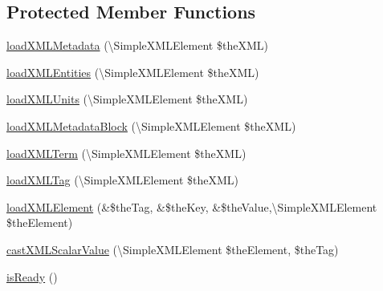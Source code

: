 \subsection*{Protected Member Functions}
\begin{DoxyCompactItemize}
\item 
\hyperlink{class_ontology_wrapper_1_1_wrapper_aa8b5ac231784ffcda74ea463c6e92cc1}{load\-X\-M\-L\-Metadata} (\textbackslash{}Simple\-X\-M\-L\-Element \$the\-X\-M\-L)
\item 
\hyperlink{class_ontology_wrapper_1_1_wrapper_adbb3bf1090ccdf7ed89ffd494a0b101c}{load\-X\-M\-L\-Entities} (\textbackslash{}Simple\-X\-M\-L\-Element \$the\-X\-M\-L)
\item 
\hyperlink{class_ontology_wrapper_1_1_wrapper_aaad33b2f3f398545a234f7650f126321}{load\-X\-M\-L\-Units} (\textbackslash{}Simple\-X\-M\-L\-Element \$the\-X\-M\-L)
\item 
\hyperlink{class_ontology_wrapper_1_1_wrapper_a3500af2ce8421aed6b1f6dcfb5112546}{load\-X\-M\-L\-Metadata\-Block} (\textbackslash{}Simple\-X\-M\-L\-Element \$the\-X\-M\-L)
\item 
\hyperlink{class_ontology_wrapper_1_1_wrapper_a14c77bdeec16286c776ebe375efdd284}{load\-X\-M\-L\-Term} (\textbackslash{}Simple\-X\-M\-L\-Element \$the\-X\-M\-L)
\item 
\hyperlink{class_ontology_wrapper_1_1_wrapper_ae15fd84eb510838a278ccd24c7bcc4a5}{load\-X\-M\-L\-Tag} (\textbackslash{}Simple\-X\-M\-L\-Element \$the\-X\-M\-L)
\item 
\hyperlink{class_ontology_wrapper_1_1_wrapper_ae5261a315a52ff325df36f277f6aba93}{load\-X\-M\-L\-Element} (\&\$the\-Tag, \&\$the\-Key, \&\$the\-Value,\textbackslash{}Simple\-X\-M\-L\-Element \$the\-Element)
\item 
\hyperlink{class_ontology_wrapper_1_1_wrapper_a4c35be252b6d9796bee31809bdd35298}{cast\-X\-M\-L\-Scalar\-Value} (\textbackslash{}Simple\-X\-M\-L\-Element \$the\-Element, \$the\-Tag)
\item 
\hyperlink{class_ontology_wrapper_1_1_wrapper_a7ae448c40693559ee0bd7898fe041fc1}{is\-Ready} ()
\end{DoxyCompactItemize}
